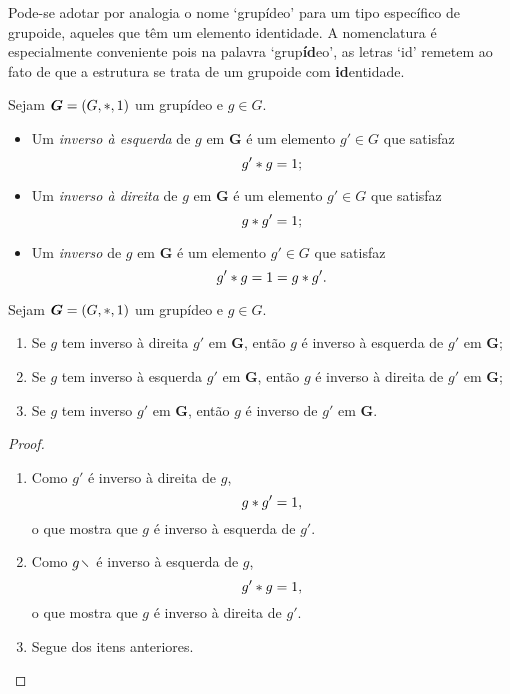 Pode-se adotar por analogia o nome `grupídeo' para um tipo específico de grupoide, aqueles que têm um elemento identidade. A nomenclatura é especialmente conveniente pois na palavra `grup\textbf{íd}eo', as letras `id' remetem ao fato de que a estrutura se trata de um grupoide com \textbf{id}entidade.

\begin{definition}[Inverso]
Sejam $\bm G = (G,\ast,1)$ um grupídeo e $g \in G$.
	\begin{itemize}
	\item Um \emph{inverso à esquerda} de $g$ em $\bm G$ é um elemento $g' \in G$ que satisfaz
		\begin{equation*}
		g' \ast g = 1;
		\end{equation*}

	\item Um \emph{inverso à direita} de $g$ em $\bm G$ é um elemento $g' \in G$ que satisfaz
		\begin{equation*}
		g \ast g' = 1;
		\end{equation*}

	\item Um \emph{inverso} de $g$ em $\bm G$ é um elemento $g' \in G$ que satisfaz
		\begin{equation*}
		g' \ast g = 1 = g \ast g'.
		\end{equation*}
	\end{itemize}
\end{definition}

\begin{proposition}
Sejam $\bm G = (G,\ast,1)$ um grupídeo e $g \in G$.
	\begin{enumerate}
		\item Se $g$ tem inverso à direita $g'$ em $\bm G$, então $g$ é inverso à esquerda de $g'$ em $\bm G$;
		\item Se $g$ tem inverso à esquerda $g'$ em $\bm G$, então $g$ é inverso à direita de $g'$ em $\bm G$;
		\item Se $g$ tem inverso $g'$ em $\bm G$, então $g$ é inverso de $g'$ em $\bm G$.
	\end{enumerate}
\end{proposition}
\begin{proof}
	\begin{enumerate}
	\item Como $g'$ é inverso à direita de $g$,
		\begin{equation*}
		g \ast g' = 1,
		\end{equation*}
	o que mostra que $g$ é inverso à esquerda de $g'$.
	\item Como $g \vid$ é inverso à esquerda de $g$,
		\begin{equation*}
		g' \ast g = 1,
		\end{equation*}
	o que mostra que $g$ é inverso à direita de $g'$.
	\item Segue dos itens anteriores.
	\qedhere
	\end{enumerate}
\end{proof}


